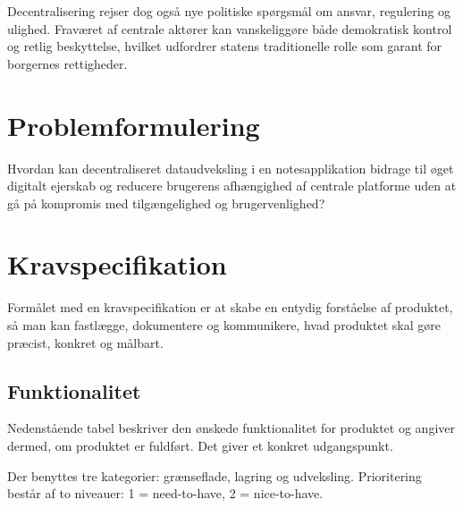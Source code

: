 \documentclass{article}
\begin{document}
Decentralisering rejser dog også nye politiske spørgsmål om ansvar,
regulering og ulighed. Fraværet af centrale aktører kan vanskeliggøre
både demokratisk kontrol og retlig beskyttelse, hvilket udfordrer
statens traditionelle rolle som garant for borgernes rettigheder.

\section{Problemformulering}
Hvordan kan decentraliseret dataudveksling i en notesapplikation
bidrage til øget digitalt ejerskab og reducere brugerens afhængighed af
centrale platforme uden at gå på kompromis med tilgængelighed og 
brugervenlighed?

\section{Kravspecifikation}
Formålet med en kravspecifikation er at skabe en entydig forståelse af
produktet, så man kan fastlægge, dokumentere og kommunikere, hvad
produktet skal gøre præcist, konkret og målbart.

\subsection{Funktionalitet}
Nedenstående tabel beskriver den ønskede funktionalitet for produktet
og angiver dermed, om produktet er fuldført. Det giver et konkret
udgangspunkt.

Der benyttes tre kategorier: grænseflade, lagring og udveksling.
Prioritering består af to niveauer: 1 = need-to-have, 2 = nice-to-have.
\end{document}
